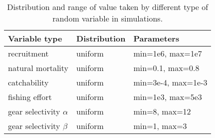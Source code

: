 
\begin{table}[ht]
\centering
\begin{tabular}{lll}
  \hline
Variable type & Distribution & Parameters \\
  \hline
recruitment               & uniform & min=1e6, max=1e7   \\
natural mortality         & uniform & min=0.1, max=0.8 \\
catchability              & uniform & min=3e-4, max=1e-3 \\
fishing effort            & uniform & min=1e3, max=5e3   \\
gear selectivity $\alpha$ & uniform & min=8, max=12      \\
gear selectivity $\beta$  & uniform & min=1, max=3       \\
   \hline
\end{tabular}
\caption{Distribution and range of value taken by different type of random variable in simulations.}
\label{tab:SimulationParameters.tex}
\end{table}
